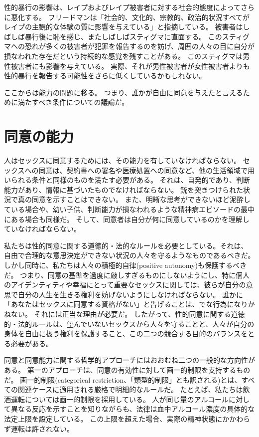 \documentclass[paper=a4,book,openany]{jlreq}
\begin{document}
性的暴行の影響は、レイプおよびレイプ被害者に対する社会的態度によってさらに悪化する。
フリードマンは「社会的、文化的、宗教的、政治的状況すべてがレイプの主観的な体験の質に影響を与えている」と指摘している。
被害者はしばしば暴行後に恥を感じ、またしばしばスティグマに直面する。
このスティグマへの恐れが多くの被害者が犯罪を報告するのを妨げ、周囲の人々の目に自分が損なわれた存在だという持続的な感覚を残すことがある。
このスティグマは男性被害者にも影響を与えている。
実際、それが男性被害者が女性被害者よりも性的暴行を報告する可能性をさらに低くしているかもしれない\citep{mezey87:_male_victim_sexual_assaul}。

ここからは能力の問題に移る。
つまり、誰かが自由に同意を与えたと言えるために満たすべき条件についての議論だ。

\section{同意の能力}

人はセックスに同意するためには、その能力を有していなければならない。
セックスへの同意は、契約書への署名や医療処置への同意など、他の生活領域で用いられる条件と同様のものを満たす必要がある。
それは、自発的であり、判断能力があり、情報に基づいたものでなければならない。
銃を突きつけられた状況で真の同意を示すことはできない。
また、明晰な思考ができないほど泥酔している場合や、幼い子供、判断能力が損なわれるような精神病エピソードの最中にある場合も同様だ。
そして、同意者は自分が何に同意しているのかを理解していなければならない。

私たちは性的同意に関する道徳的・法的なルールを必要としている。それは、
自由で合理的な意思決定ができない状況の人々を守るようなものであるべきだ。
しかし同時に、私たちは人々の積極的自律(positive autonomy)も保護するべきだ。
つまり、同意の基準を過度に厳しすぎるものにしないようにし、特に個人のアイデンティティや幸福にとって重要なセックスに関しては、彼らが自分の意思で自分の人生を生きる権利を妨げないようにしなければならない。
誰かに「あなたはセックスに同意する資格がない」と告げることは、でな行為になりかねない。
それには正当な理由が必要だ。
したがって、性的同意に関する道徳的・法的ルールは、望んでいないセックスから人々を守ることと、人々が自分の身体を自由に扱う権利を保護すること、この二つの競合する目的のバランスをとる必要がある。

同意と同意能力に関する哲学的アプローチにはおおむね二つの一般的な方向性がある。
第一のアプローチは、同意の有効性に対して画一的制限を支持するものだ。
画一的制限(categorical restriction、「類型的制限」とも訳される)とは、すべての関連ケースに適用される厳格で明細的なルールだ。
たとえば、私たちは飲酒運転については画一的制限を採用している。
人が同じ量のアルコールに対して異なる反応を示すことを知りながらも、法律は血中アルコール濃度の具体的な法定上限を設定している。
この上限を超えた場合、実際の精神状態にかかわらず運転は許されない。
\end{document}
